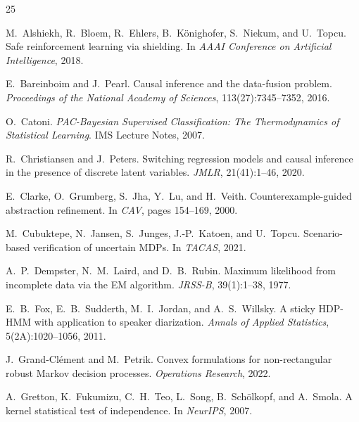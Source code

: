 \documentclass[11pt]{article}
\begin{document}

\begin{thebibliography}{25}

M.~Alshiekh, R.~Bloem, R.~Ehlers, B.~K\"onighofer, S.~Niekum, and
U.~Topcu.
\newblock Safe reinforcement learning via shielding.
\newblock In \emph{AAAI Conference on Artificial Intelligence}, 2018.

E.~Bareinboim and J.~Pearl.
\newblock Causal inference and the data-fusion problem.
\newblock \emph{Proceedings of the National Academy of Sciences},
113(27):7345--7352, 2016.

O.~Catoni.
\newblock \emph{PAC-Bayesian Supervised Classification: The Thermodynamics
of Statistical Learning}.
\newblock IMS Lecture Notes, 2007.

R.~Christiansen and J.~Peters.
\newblock Switching regression models and causal inference in the presence
of discrete latent variables.
\newblock \emph{JMLR}, 21(41):1--46, 2020.

E.~Clarke, O.~Grumberg, S.~Jha, Y.~Lu, and H.~Veith.
\newblock Counterexample-guided abstraction refinement.
\newblock In \emph{CAV}, pages 154--169, 2000.

M.~Cubuktepe, N.~Jansen, S.~Junges, J.-P.~Katoen, and U.~Topcu.
\newblock Scenario-based verification of uncertain MDPs.
\newblock In \emph{TACAS}, 2021.

A.~P.~Dempster, N.~M.~Laird, and D.~B.~Rubin.
\newblock Maximum likelihood from incomplete data via the {EM} algorithm.
\newblock \emph{JRSS-B}, 39(1):1--38, 1977.

E.~B.~Fox, E.~B.~Sudderth, M.~I.~Jordan, and A.~S.~Willsky.
\newblock A sticky {HDP-HMM} with application to speaker diarization.
\newblock \emph{Annals of Applied Statistics}, 5(2A):1020--1056, 2011.

J.~Grand-Cl\'ement and M.~Petrik.
\newblock Convex formulations for non-rectangular robust {M}arkov
decision processes.
\newblock \emph{Operations Research}, 2022.

A.~Gretton, K.~Fukumizu, C.~H.~Teo, L.~Song, B.~Sch\"olkopf, and
A.~Smola.
\newblock A kernel statistical test of independence.
\newblock In \emph{NeurIPS}, 2007.


\end{thebibliography}
\end{document}
